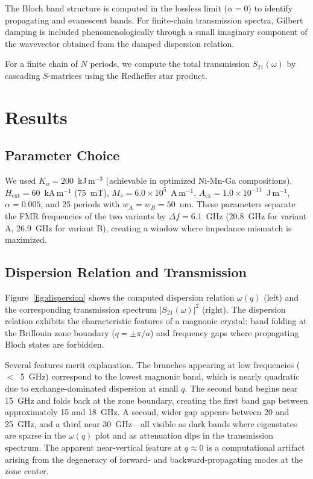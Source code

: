 \documentclass[aip,jap,reprint,floatfix,nofootinbib]{revtex4-2}
\begin{document}
The Bloch band structure is computed in the lossless limit ($\alpha = 0$) to identify propagating and evanescent bands. For finite-chain transmission spectra, Gilbert damping is included phenomenologically through a small imaginary component of the wavevector obtained from the damped dispersion relation.

For a finite chain of $N$ periods, we compute the total transmission $S_{21}(\omega)$ by cascading $S$-matrices using the Redheffer star product.

\section{Results}
\label{sec:results}

\subsection{Parameter Choice}
\label{sec:optimization}

We used $K_u = 200$~kJ\,m$^{-3}$ (achievable in optimized Ni-Mn-Ga compositions), $H_{\mathrm{ext}} = 60$~kA\,m$^{-1}$ (75~mT), $M_s = 6.0 \times 10^5$~A\,m$^{-1}$, $A_{\mathrm{ex}} = 1.0 \times 10^{-11}$~J\,m$^{-1}$, $\alpha = 0.005$, and 25 periods with $w_A = w_B = 50$~nm. These parameters separate the FMR frequencies of the two variants by $\Delta f = 6.1$~GHz (20.8~GHz for variant A, 26.9~GHz for variant B), creating a window where impedance mismatch is maximized.

\subsection{Dispersion Relation and Transmission}
\label{sec:dispersion}

Figure~\ref{fig:dispersion} shows the computed dispersion relation $\omega(q)$ (left) and the corresponding transmission spectrum $|S_{21}(\omega)|^2$ (right). The dispersion relation exhibits the characteristic features of a magnonic crystal: band folding at the Brillouin zone boundary ($q = \pm \pi/a$) and frequency gaps where propagating Bloch states are forbidden. 

Several features merit explanation. The branches appearing at low frequencies ($<$~5~GHz) correspond to the lowest magnonic band, which is nearly quadratic due to exchange-dominated dispersion at small $q$. The second band begins near 15~GHz and folds back at the zone boundary, creating the first band gap between approximately 15 and 18~GHz. A second, wider gap appears between 20 and 25~GHz, and a third near 30~GHz---all visible as dark bands where eigenstates are sparse in the $\omega(q)$ plot and as attenuation dips in the transmission spectrum. The apparent near-vertical feature at $q \approx 0$ is a computational artifact arising from the degeneracy of forward- and backward-propagating modes at the zone center.
\end{document}
